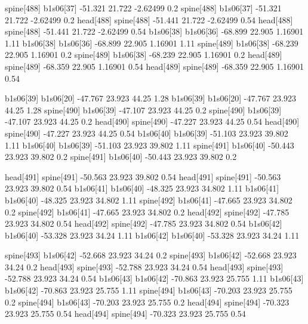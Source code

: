 spine[488]    b1s06[37]    -51.321    21.722    -2.62499    0.2
spine[488]    b1s06[37]    -51.321    21.722    -2.62499    0.2
head[488]    spine[488]    -51.441    21.722    -2.62499    0.54
head[488]    spine[488]    -51.441    21.722    -2.62499    0.54
b1s06[38]    b1s06[36]    -68.899    22.905    1.16901    1.11
b1s06[38]    b1s06[36]    -68.899    22.905    1.16901    1.11
spine[489]    b1s06[38]    -68.239    22.905    1.16901    0.2
spine[489]    b1s06[38]    -68.239    22.905    1.16901    0.2
head[489]    spine[489]    -68.359    22.905    1.16901    0.54
head[489]    spine[489]    -68.359    22.905    1.16901    0.54


b1s06[39]    b1s06[20]    -47.767    23.923    44.25    1.28
b1s06[39]    b1s06[20]    -47.767    23.923    44.25    1.28
spine[490]    b1s06[39]    -47.107    23.923    44.25    0.2
spine[490]    b1s06[39]    -47.107    23.923    44.25    0.2
head[490]    spine[490]    -47.227    23.923    44.25    0.54
head[490]    spine[490]    -47.227    23.923    44.25    0.54
b1s06[40]    b1s06[39]    -51.103    23.923    39.802    1.11
b1s06[40]    b1s06[39]    -51.103    23.923    39.802    1.11
spine[491]    b1s06[40]    -50.443    23.923    39.802    0.2
spine[491]    b1s06[40]    -50.443    23.923    39.802    0.2


head[491]    spine[491]    -50.563    23.923    39.802    0.54
head[491]    spine[491]    -50.563    23.923    39.802    0.54
b1s06[41]    b1s06[40]    -48.325    23.923    34.802    1.11
b1s06[41]    b1s06[40]    -48.325    23.923    34.802    1.11
spine[492]    b1s06[41]    -47.665    23.923    34.802    0.2
spine[492]    b1s06[41]    -47.665    23.923    34.802    0.2
head[492]    spine[492]    -47.785    23.923    34.802    0.54
head[492]    spine[492]    -47.785    23.923    34.802    0.54
b1s06[42]    b1s06[40]    -53.328    23.923    34.24    1.11
b1s06[42]    b1s06[40]    -53.328    23.923    34.24    1.11


spine[493]    b1s06[42]    -52.668    23.923    34.24    0.2
spine[493]    b1s06[42]    -52.668    23.923    34.24    0.2
head[493]    spine[493]    -52.788    23.923    34.24    0.54
head[493]    spine[493]    -52.788    23.923    34.24    0.54
b1s06[43]    b1s06[42]    -70.863    23.923    25.755    1.11
b1s06[43]    b1s06[42]    -70.863    23.923    25.755    1.11
spine[494]    b1s06[43]    -70.203    23.923    25.755    0.2
spine[494]    b1s06[43]    -70.203    23.923    25.755    0.2
head[494]    spine[494]    -70.323    23.923    25.755    0.54
head[494]    spine[494]    -70.323    23.923    25.755    0.54



